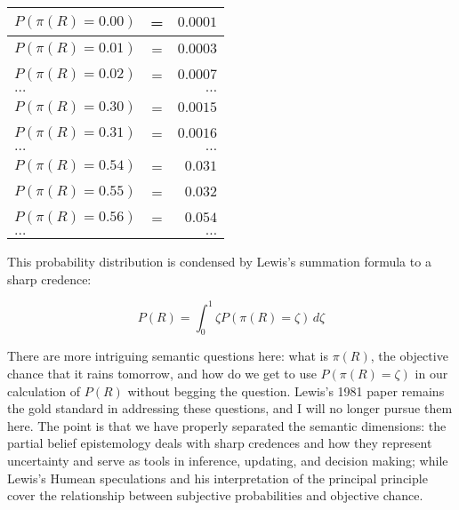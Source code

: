 \begin{tabular}{|lcr|} 
  \hline
  $P(\pi(R)=0.00)$ & = & $0.0001$ \\ \hline
  $P(\pi(R)=0.01)$ & = & $0.0003$ \\ \hline
  $P(\pi(R)=0.02)$ & = & $0.0007$ \\ \hline
  $\ldots$ & & $\ldots$ \\ \hline
  $P(\pi(R)=0.30)$ & = & $0.0015$ \\ \hline
  $P(\pi(R)=0.31)$ & = & $0.0016$ \\ \hline
  $\ldots$ & & $\ldots$ \\ \hline
  $P(\pi(R)=0.54)$ & = & $0.031$ \\ \hline
  $P(\pi(R)=0.55)$ & = & $0.032$ \\ \hline
  $P(\pi(R)=0.56)$ & = & $0.054$ \\ \hline
  $\ldots$ & & $\ldots$ \\ \hline
\end{tabular}

This probability distribution is condensed by Lewis's summation formula to a sharp credence:

\begin{equation}
  \label{eq:s2}
  P(R)=\int_{0}^{1}\zeta{}P(\pi(R)=\zeta)\,d\zeta
\end{equation}

There are more intriguing semantic questions here: what is $\pi(R)$, the objective chance that it rains tomorrow, and how do we get to use $P(\pi(R)=\zeta)$ in our calculation of $P(R)$ without begging the question. Lewis's 1981 paper  remains the gold standard in addressing these questions, and I will no longer pursue them here. The point is that we have properly separated the semantic dimensions: the partial belief epistemology deals with sharp credences and how they represent uncertainty and serve as tools in inference, updating, and decision making; while Lewis's Humean speculations and his interpretation of the principal principle cover the relationship between subjective probabilities and objective chance.

